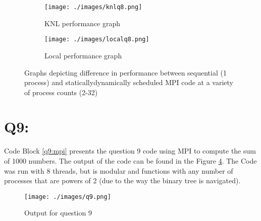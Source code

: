 \documentclass[11pt]{article}
\begin{document}
\begin{figure}
\centering
\begin{subfigure}[t]{0.48\textwidth}
  \centering
    \texttt{[image: ./images/knlq8.png]}
  \caption{KNL performance graph}\label{fig:q8S}
\end{subfigure}%
\hfill
\begin{subfigure}[t]{0.48\textwidth}
  \centering
    \texttt{[image: ./images/localq8.png]}
  \caption{Local performance graph}\label{fig:q8D}
\end{subfigure}%
\caption{Graphs depicting difference in performance between sequential (1 process) and statically\/dynamically scheduled MPI code at a variety of process counts (2-32)}
\label{fig:q8}
\end{figure}

\clearpage

\section*{Q9:}

Code Block \ref{q9:mpi} presents the question 9 code using MPI to compute the sum of 1000 numbers.
The output of the code can be found in the Figure \ref{fig:q9}.
The Code was run with 8 threads, but is modular and functions with any number of processes that are powers of 2 (due to the way the binary tree is navigated).




\begin{figure}[H]
\centering
    \texttt{[image: ./images/q9.png]}
\caption{Output for question 9}
\label{fig:q9}
\end{figure}

\clearpage
\begin{appendices}\label{Appendix}
  
  
  
  
  

\end{appendices}
\end{document}
